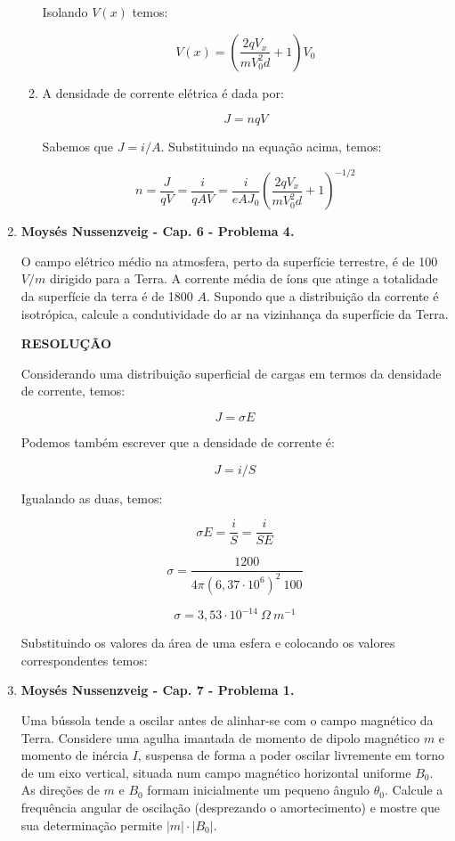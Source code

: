 \documentclass[11pt,a4paper]{article}
\begin{document}
\begin{enumerate}
\begin{enumerate}
Isolando $V(x)$ temos:

$$V(x) = \left(\displaystyle\dfrac{2qV_x}{mV_0^2d} + 1\right)V_0$$

\item

A densidade de corrente elétrica é dada por:

$$J = n q V$$

Sabemos que $J = i/A$. Substituindo na equação acima, temos:

$$n = \displaystyle\dfrac{J}{q V} = \displaystyle\dfrac{i}{q A V} = \displaystyle\dfrac{i}{e A J_0 } \left(\displaystyle\dfrac{2qV_x}{mV_0^2d} + 1\right)^{-1/2}$$
\end{enumerate}


\item \textbf{Moysés Nussenzveig - Cap. 6 - Problema 4.}

O campo elétrico médio na atmosfera, perto da superfície terrestre, é de 100 $V/m$ dirigido para a Terra. A corrente média de íons que atinge a totalidade da superfície da terra é de 1800 $A$. Supondo que a distribuição da corrente é isotrópica, calcule a condutividade do ar na vizinhança da superfície da Terra.


\textbf{RESOLUÇÃO}

Considerando uma distribuição superficial de cargas em termos da densidade de corrente, temos:

$$J = \sigma E$$

Podemos também escrever que a densidade de corrente é:

$$J = i/S$$

Igualando as duas, temos:

$$\sigma E = \displaystyle\dfrac{i}{S} = \displaystyle\dfrac{i}{S E}$$

$$\sigma = \displaystyle\dfrac{1200}{4 \pi (6,37 \cdot 10^6)^2 \ 100}$$

$$\sigma = 3,53 \cdot 10^{-14} \ \Omega \ m^{-1}$$

Substituindo os valores da área de uma esfera e colocando os valores correspondentes temos:


\item \textbf{Moysés Nussenzveig - Cap. 7 - Problema 1.}

Uma bússola tende a oscilar antes de alinhar-se com o campo magnético da Terra. Considere uma agulha imantada de momento de dipolo magnético $m$ e momento de inércia $I$, suspensa de forma a poder oscilar livremente em torno de um eixo vertical, situada num campo magnético horizontal uniforme $B_0$. As direções de $m$ e $B_0$ formam inicialmente um pequeno ângulo $\theta_0$. Calcule a frequência angular de oscilação (desprezando o amortecimento) e mostre que sua determinação permite $|m| \cdot |B_0|$.


\end{enumerate}
\end{document}
